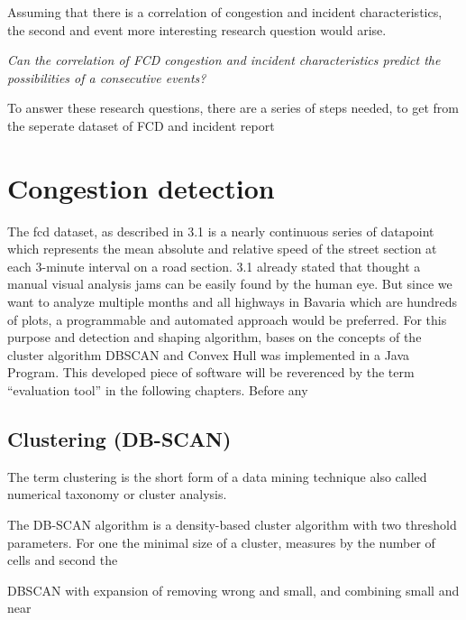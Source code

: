 \documentclass[a4paper,12pt]{report}
\begin{document}
\bigskip

\par Assuming that there is a correlation of congestion and incident characteristics, the second and event more interesting research question would arise.

\begin{center}
	\textit{Can the correlation of FCD congestion and incident characteristics predict the possibilities of a consecutive events?}
\end{center}

\bigskip

\par To answer these research questions, there are a series of steps needed, to get from the seperate dataset of FCD and incident report
\section{Congestion detection}
The \acrshort{fcd} dataset, as described in 3.1 is a nearly continuous series of datapoint which represents the mean absolute and relative speed of the street section at each 3-minute interval on a road section. 3.1 already stated that thought a manual visual analysis jams can be easily found by the human eye. But since we want to analyze multiple months and all highways in Bavaria which are hundreds of plots, a programmable and automated approach would be preferred. For this purpose and detection and shaping algorithm, bases on the concepts of the cluster algorithm DBSCAN and Convex Hull was implemented in a Java Program. This developed piece of software will be reverenced by the term “evaluation tool” in the following chapters.
Before any  
\subsection{Clustering (DB-SCAN)}
The term clustering is the short form of a data mining technique also called numerical taxonomy or cluster analysis.

The DB-SCAN algorithm is a density-based cluster algorithm with two threshold parameters. For one the minimal size of a cluster, measures by the number of cells and second the 


DBSCAN with expansion of removing wrong and small, and combining small and near
%
\end{document}
